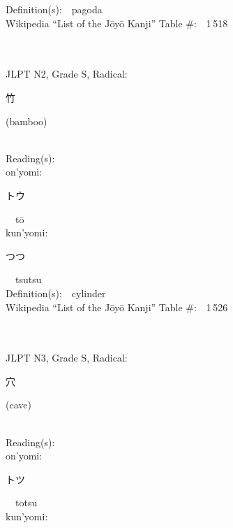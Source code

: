 \begin{multicols}{2}
Definition(s):\ \ pagoda \\
Wikipedia ``List of the J\=oy\=o Kanji'' Table \#:\ \ 1\,518 \\
\ \ \\
{\fontsize{34pt}{40pt}  }\ \ \\  %
{JLPT N2, Grade S, Radical:\ \ {\begin{CJK}{UTF8}{min} 竹 \end{CJK}} (bamboo) } \\
Reading(s):\ \ \\
{\hspace*{1em}}on'yomi:\ \ \\
{\hspace*{2em}}{\begin{CJK}{UTF8}{min} トウ \end{CJK}}\ \ t\=o\ \ \\
{\hspace*{1em}}kun'yomi:\ \ \\
{\hspace*{2em}}{\begin{CJK}{UTF8}{min} つつ \end{CJK}}\ \ tsutsu\ \ \\
Definition(s):\ \ cylinder \\
Wikipedia ``List of the J\=oy\=o Kanji'' Table \#:\ \ 1\,526 \\
\ \ \\
{\fontsize{34pt}{40pt}  }\ \ \\  %
{JLPT N3, Grade S, Radical:\ \ {\begin{CJK}{UTF8}{min} 穴 \end{CJK}} (cave) } \\
Reading(s):\ \ \\
{\hspace*{1em}}on'yomi:\ \ \\
{\hspace*{2em}}{\begin{CJK}{UTF8}{min} トツ \end{CJK}}\ \ totsu\ \ \\
{\hspace*{1em}}kun'yomi:\ \ \\

\end{multicols}
